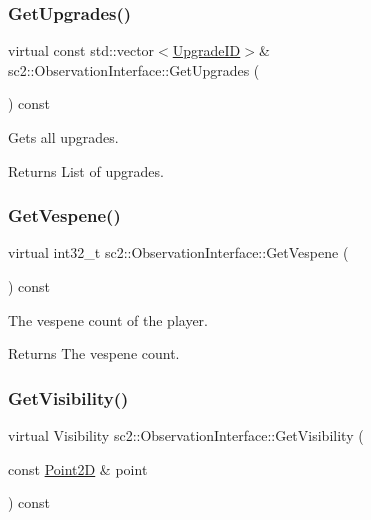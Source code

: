 \subsubsection{\texorpdfstring{Get\+Upgrades()}{GetUpgrades()}}
{\footnotesize\ttfamily virtual const std\+::vector$<$\hyperlink{classsc2_1_1_s_c2_type}{Upgrade\+ID}$>$\& sc2\+::\+Observation\+Interface\+::\+Get\+Upgrades (\begin{DoxyParamCaption}{ }\end{DoxyParamCaption}) const\hspace{0.3cm}{\ttfamily [pure virtual]}}

Gets all upgrades. \begin{DoxyReturn}{Returns}
List of upgrades. 
\end{DoxyReturn}
\mbox{\label{classsc2_1_1_observation_interface_aa31de2f1b14a2306a282fef7314fbf37}} 
\subsubsection{\texorpdfstring{Get\+Vespene()}{GetVespene()}}
{\footnotesize\ttfamily virtual int32\+\_\+t sc2\+::\+Observation\+Interface\+::\+Get\+Vespene (\begin{DoxyParamCaption}{ }\end{DoxyParamCaption}) const\hspace{0.3cm}{\ttfamily [pure virtual]}}

The vespene count of the player. \begin{DoxyReturn}{Returns}
The vespene count. 
\end{DoxyReturn}
\mbox{\label{classsc2_1_1_observation_interface_ab17337d7e05f1e9cf80252da10f01b04}} 
\subsubsection{\texorpdfstring{Get\+Visibility()}{GetVisibility()}}
{\footnotesize\ttfamily virtual Visibility sc2\+::\+Observation\+Interface\+::\+Get\+Visibility (\begin{DoxyParamCaption}\item[{const \hyperlink{structsc2_1_1_point2_d}{Point2D} \&}]{point }\end{DoxyParamCaption}) const\hspace{0.3cm}{\ttfamily [pure virtual]}}

